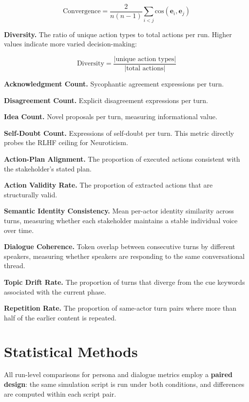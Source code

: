 \documentclass[12pt, a4paper]{report}
\begin{document}
\begin{equation}
    \text{Convergence} = \frac{2}{n(n-1)} \sum_{i < j} \text{cos}(\mathbf{e}_i, \mathbf{e}_j)
    \label{eq:convergence}
\end{equation}

\textbf{Diversity.} The ratio of unique action types to total actions per run. Higher values indicate more varied decision-making:

\begin{equation}
    \text{Diversity} = \frac{|\text{unique action types}|}{|\text{total actions}|}
    \label{eq:diversity}
\end{equation}

\textbf{Acknowledgment Count.} Sycophantic agreement expressions per turn.

\textbf{Disagreement Count.} Explicit disagreement expressions per turn.

\textbf{Idea Count.} Novel proposals per turn, measuring informational value.

\textbf{Self-Doubt Count.} Expressions of self-doubt per turn. This metric directly probes the RLHF ceiling for Neuroticism.

\textbf{Action-Plan Alignment.} The proportion of executed actions consistent with the stakeholder's stated plan.

\textbf{Action Validity Rate.} The proportion of extracted actions that are structurally valid.

\textbf{Semantic Identity Consistency.} Mean per-actor identity similarity across turns, measuring whether each stakeholder maintains a stable individual voice over time.

\textbf{Dialogue Coherence.} Token overlap between consecutive turns by different speakers, measuring whether speakers are responding to the same conversational thread.

\textbf{Topic Drift Rate.} The proportion of turns that diverge from the cue keywords associated with the current phase.

\textbf{Repetition Rate.} The proportion of same-actor turn pairs where more than half of the earlier content is repeated.


\section{Statistical Methods}

All run-level comparisons for persona and dialogue metrics employ a \textbf{paired design}: the same simulation script is run under both conditions, and differences are computed within each script pair.
\end{document}
